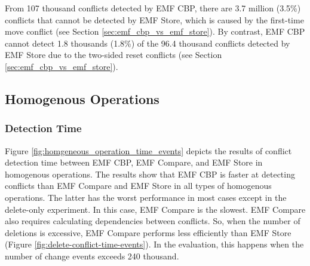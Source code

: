 From 107 thousand conflicts detected by EMF CBP, there are 3.7 million (3.5\%) conflicts that cannot be detected by EMF Store, which is caused by the first-time move conflict (see Section \ref{sec:emf_cbp_vs_emf_store}). By contrast, EMF CBP cannot detect 1.8 thousands (1.8\%) of the 96.4 thousand conflicts detected by EMF Store due to the two-sided reset conflicts (see Section \ref{sec:emf_cbp_vs_emf_store}). 



%
%
%

\subsection{Homogenous Operations}
\label{sec:homogenous-operation_conflict}

\subsubsection{Detection Time} 
\label{sec:detection_time}
Figure \ref{fig:homgeneous_operation_time_events} depicts the results of conflict detection time between EMF CBP, EMF Compare, and EMF Store in homogenous operations. The results show that EMF CBP is faster at detecting conflicts than EMF Compare and EMF Store in all types of homogenous operations. The latter has the worst performance in most cases except in the delete-only experiment. In this case, EMF Compare is the slowest. EMF Compare also requires calculating dependencies between conflicts. So, when the number of deletions is excessive, EMF Compare performs less efficiently than EMF Store (Figure \ref{fig:delete-conflict-time-events}). In the evaluation, this happens when the number of change events exceeds 240 thousand.

